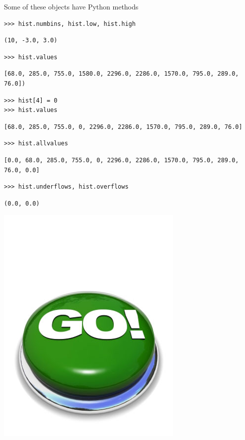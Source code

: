 \documentclass[aspectratio=169]{beamer}
\begin{document}
\begin{frame}[fragile]{Some of these objects have Python methods}
\vspace{0.5 cm}
\small
\begin{verbatim}
>>> hist.numbins, hist.low, hist.high
\end{verbatim}
\begin{verbatim}
(10, -3.0, 3.0)
\end{verbatim}
\begin{verbatim}
>>> hist.values
\end{verbatim}
\begin{verbatim}
[68.0, 285.0, 755.0, 1580.0, 2296.0, 2286.0, 1570.0, 795.0, 289.0, 76.0])
\end{verbatim}
\begin{verbatim}
>>> hist[4] = 0
>>> hist.values
\end{verbatim}
\begin{verbatim}
[68.0, 285.0, 755.0, 0, 2296.0, 2286.0, 1570.0, 795.0, 289.0, 76.0]
\end{verbatim}
\begin{verbatim}
>>> hist.allvalues
\end{verbatim}
\begin{verbatim}
[0.0, 68.0, 285.0, 755.0, 0, 2296.0, 2286.0, 1570.0, 795.0, 289.0, 76.0, 0.0]
\end{verbatim}
\begin{verbatim}
>>> hist.underflows, hist.overflows
\end{verbatim}
\begin{verbatim}
(0.0, 0.0)
\end{verbatim}

\vspace{-7 cm}
\hfill \includegraphics[width=1.5 cm]{safe.png}\hspace{-0.9 cm}
\vspace{7 cm}
\end{frame}
\end{document}
